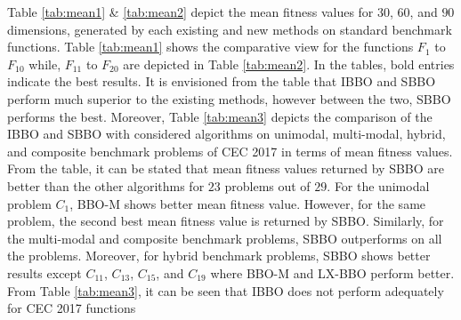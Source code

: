Table \ref{tab:mean1} \& \ref{tab:mean2} depict the mean fitness values for $30$, $60$, and $90$ dimensions, generated by each existing and new methods  on standard benchmark functions. Table \ref{tab:mean1} shows the comparative view for the functions $F_1$ to $F_{10}$ while, $F_{11}$ to $F_{20}$ are depicted in Table \ref{tab:mean2}. In the tables, bold entries indicate the best results. It is envisioned from the table that IBBO and SBBO perform much superior to the existing methods, however between the two, SBBO performs the best. Moreover, Table \ref{tab:mean3} depicts the comparison of the IBBO and SBBO with considered algorithms on unimodal, multi-modal, hybrid, and composite benchmark problems of CEC 2017 in terms of mean fitness values. From the table, it can be stated that mean fitness values returned by SBBO are better than the other algorithms for $23$ problems out of $29$. For the unimodal problem $C_1$, BBO-M shows better mean fitness value. However, for the same problem, the second best mean fitness value is returned by SBBO. Similarly, for the multi-modal and composite benchmark problems, SBBO outperforms on all the problems.  Moreover, for hybrid benchmark problems, SBBO shows better results except $C_{11}$, $C_{13}$, $C_{15}$, and $C_{19}$ where BBO-M and LX-BBO perform better. From Table \ref{tab:mean3}, it can be seen that IBBO does not perform adequately for CEC 2017 functions

